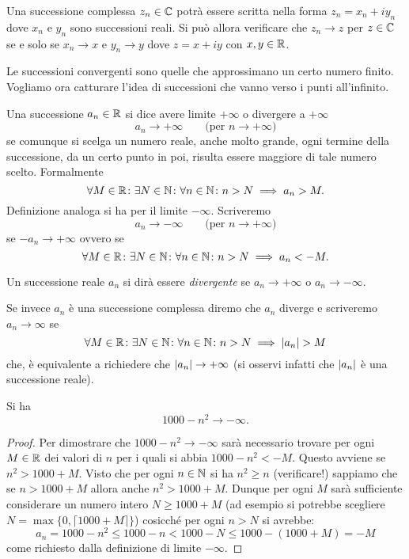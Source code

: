 \begin{exercise}
Una successione complessa $z_n\in \mathbb C$ potrà essere scritta
nella forma $z_n = x_n + i y_n$ dove $x_n$ e $y_n$ sono successioni
reali. Si può allora verificare che $z_n\to z$ per $z\in \mathbb C$ se e solo se
$x_n\to x$ e $y_n\to y$ dove $z=x+ iy$ con $x,y\in \mathbb R$.
\end{exercise}

Le successioni convergenti sono quelle che approssimano un
certo numero finito.
Vogliamo ora catturare l'idea di successioni che vanno verso i
punti all'infinito.

\begin{definition}
\mymark{***}
Una successione $a_n\in \mathbb R$ si dice avere limite $+\infty$
o divergere a $+\infty$
\[
  a_n \to +\infty \qquad\text{(per $n\to +\infty$)}
\]
se comunque si scelga un numero reale, anche molto grande,
ogni termine della successione, da un certo punto in poi,
risulta essere maggiore di tale numero scelto. Formalmente
\begin{equation}\label{eq:limite_infinito_successione}
  \forall M\in \mathbb R\colon \exists N\in \mathbb N \colon \forall n\in \mathbb N\colon
  n>N \implies a_n >M.
\end{equation}
Definizione analoga si ha per il limite $-\infty$. Scriveremo
\[
  a_n \to -\infty \qquad \text{(per $n\to +\infty$)}
\]
se $-a_n\to +\infty$ ovvero se
\begin{equation}\label{eq:limite_meno_infinito_successione}
  \forall M\in \mathbb R\colon \exists N\in \mathbb N \colon \forall n\in \mathbb N\colon
  n>N\implies a_n < -M.
\end{equation}

Un successione reale $a_n$ si dirà essere \emph{divergente}
se $a_n\to +\infty$ o $a_n\to -\infty$.

Se invece $a_n$ è una successione complessa diremo che $a_n$ diverge e scriveremo
$a_n \to \infty$
se
\[
  \forall M\in \mathbb R\colon \exists N \in \mathbb N \colon \forall n\in \mathbb N \colon
  n>N \implies {\left|a_n\right|} > M
\]
che, è equivalente a richiedere che ${\left|a_n\right|}\to +\infty$
(si osservi infatti che ${\left|a_n\right|}$ è una successione reale).
\end{definition}

\begin{example}
Si ha
\[
  1000-n^2 \to -\infty.
\]
\end{example}
%
\begin{proof}
Per dimostrare che $1000-n^2\to -\infty$ sarà
necessario trovare per ogni $M\in \mathbb R$
dei valori di $n$ per i quali si abbia $1000-n^2 < -M$.
Questo avviene se $n^2 > 1000 + M$. Visto che per ogni $n\in \mathbb N$
si ha $n^2 \ge n$ (verificare!) sappiamo che se $n> 1000+M$ allora
anche $n^2 > 1000+M$. Dunque per ogni $M$ sarà sufficiente considerare
un numero intero $N \ge 1000 + M$
(ad esempio si potrebbe scegliere $N = \max\{0, \lceil 1000 + M\rceil\}$)
cosicché per ogni $n>N$ si avrebbe:
\[
 a_n = 1000 - n^2 \le 1000 - n < 1000 - N \le 1000 - (1000  + M) = -M
\]
come richiesto dalla definizione di limite $-\infty$.
\end{proof}

